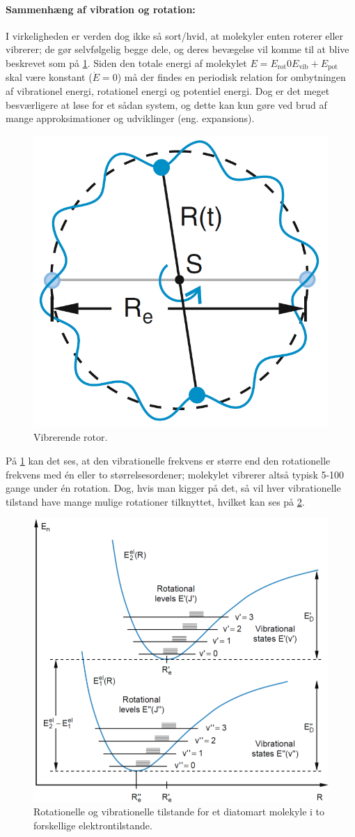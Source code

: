 \paragraph{Sammenhæng af vibration og rotation:} I virkeligheden er verden dog ikke så sort/hvid, at molekyler enten roterer eller vibrerer; de gør selvfølgelig begge dele, og deres bevægelse vil komme til at blive beskrevet som på \cref{fig:Q20_VibratingRotor}. Siden den totale energi af molekylet $E = E_\text{rot} 0 E_\text{vib} + E_\text{pot}$ skal være konstant ($\Dot{E} = 0$) må der findes en periodisk relation for ombytningen af vibrationel energi, rotationel energi og potentiel energi. Dog er det meget besværligere at løse for et sådan system, og dette kan kun gøre ved brud af mange approksimationer og udviklinger (eng. expansions).

\begin{figure}[!h]
    \centering
    \includegraphics[width=.35\textwidth]{Q20/images/VibratingRotor.PNG}
    \caption{Vibrerende rotor.}
    \label{fig:Q20_VibratingRotor}
\end{figure}

På \cref{fig:Q20_VibratingRotor} kan det ses, at den vibrationelle frekvens er større end den rotationelle frekvens med én eller to størrelsesordener; molekylet vibrerer altså typisk 5-100 gange under én rotation. Dog, hvis man kigger på det, så vil hver vibrationelle tilstand have mange mulige rotationer tilknyttet, hvilket kan ses på \cref{fig:Q20_VibrationOgRotationPotential}.

\begin{figure}[!h]
    \centering
    \includegraphics[width=.8\textwidth]{Q20/images/VibrationOgRotationIPotentialDiatomartMolekyle.PNG}
    \caption{Rotationelle og vibrationelle tilstande for et diatomart molekyle i to forskellige elektrontilstande.}
    \label{fig:Q20_VibrationOgRotationPotential}
\end{figure}